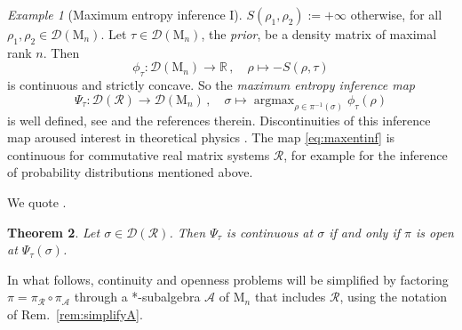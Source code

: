 \documentclass[a4paper,11pt,reqno]{amsart}
\newcommand{\R}{\mathbb{R}}
\newcommand{\M}{\mathrm{M}}
\newcommand{\cA}{\mathcal{A}}
\newcommand{\cD}{\mathcal{D}}
\newcommand{\cR}{\mathcal{R}}
\DeclareMathOperator\argmax{argmax}
\newtheorem{thm}{Theorem}[section]
\theoremstyle{definition}
\theoremstyle{remark}
\newtheorem{exa}[thm]{Example}
\numberwithin{equation}{section}
\begin{document}
\begin{exa}[Maximum entropy inference I]
$S(\rho_1,\rho_2):=+\infty$ otherwise, for all $\rho_1,\rho_2\in\cD(\M_n)$. 
Let $\tau\in\cD(\M_n)$, the \emph{prior}, be a density matrix of 
maximal rank $n$. Then
\[\textstyle
\phi_\tau:\cD(\M_n)\to\R\,,
\quad
\rho\mapsto-S(\rho,\tau)
\]
is continuous and strictly concave. So the \emph{maximum entropy inference map}
\begin{equation}\label{eq:maxentinf}\textstyle
\Psi_\tau:\cD(\cR)\to\cD(\M_n)\,,
\quad
\sigma\mapsto\argmax_{\rho\in\pi^{-1}(\sigma)}\phi_\tau(\rho)
\end{equation}
is well defined, see \cite[Def.~1.1]{Weis2014} and the references therein. 
Discontinuities of this inference map \cite{WeisKnauf2012} aroused interest in 
theoretical physics 
\cite{Chen-etal2015,HuberGuehne2016,Lostaglio-etal2017,Winter2016}. The map 
\eqref{eq:maxentinf} is continuous for commutative real matrix systems $\cR$, 
for example for the inference of probability distributions mentioned above.
\end{exa}
%
We quote \cite[Thm.~4.9]{Weis2014}.
\par
%
\begin{thm}\label{thm:MEcont}
Let $\sigma\in\cD(\cR)$. Then $\Psi_\tau$ is continuous at $\sigma$ if and 
only if $\pi$ is open at $\Psi_\tau(\sigma)$.
\end{thm}
%
In what follows, continuity and openness problems will be simplified by 
factoring $\pi=\pi_\cR\circ\pi_\cA$ through a *-subalgebra $\cA$ of $\M_n$ 
that includes $\cR$, using the notation of Rem.~\ref{rem:simplifyA}.
\par
%
\end{document}
